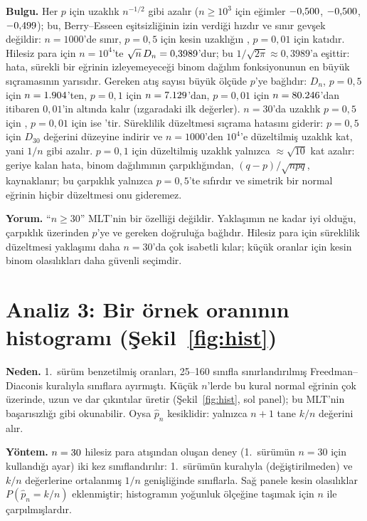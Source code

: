 \documentclass[11pt,a4paper]{article}
\begin{document}
\textbf{Bulgu.} Her $p$ için uzaklık $n^{-1/2}$ gibi azalır ($n \ge 10^3$ için eğimler $-0{,}500$, $-0{,}500$,
$-0{,}499$); bu, Berry--Esseen eşitsizliğinin izin verdiği hızdır ve sınır gevşek değildir: $n = 1000$'de sınır,
$p = 0{,}5$ için kesin uzaklığın \BeOverDHalf{}, $p = 0{,}01$ için \BeOverDHundredth{} katıdır. Hilesiz para için $n = 10^4$'te
$\sqrt n\,D_n = 0{,}3989$'dur; bu $1/\sqrt{2\pi} \approx 0{,}3989$'a eşittir: hata, sürekli bir eğrinin izleyemeyeceği
binom dağılım fonksiyonunun en büyük sıçramasının yarısıdır. Gereken atış sayısı büyük ölçüde $p$'ye bağlıdır: $D_n$,
$p = 0{,}5$ için $n = 1.904$'ten, $p = 0{,}1$ için $n = 7.129$'dan, $p = 0{,}01$ için $n = 80.246$'dan
itibaren $0{,}01$'in altında kalır (ızgaradaki ilk değerler). $n = 30$'da uzaklık $p = 0{,}5$ için \DHalfThirty{}, $p = 0{,}01$
için ise \DHundredthThirty{}'tir. Süreklilik düzeltmesi sıçrama hatasını giderir: $p = 0{,}5$ için $D_{30}$ değerini \DccHalfThirty{}
düzeyine indirir ve $n = 1000$'den $10^4$'e düzeltilmiş uzaklık \DccRatioHalf{} kat, yani $1/n$ gibi azalır. $p = 0{,}1$ için düzeltilmiş
uzaklık yalnızca \DccRatioTenth{} $\approx \sqrt{10}$ kat azalır: geriye kalan hata, binom dağılımının çarpıklığından,
$(q-p)/\sqrt{npq}$, kaynaklanır; bu çarpıklık yalnızca $p = 0{,}5$'te sıfırdır ve simetrik bir normal eğrinin hiçbir düzeltmesi
onu gideremez.

\textbf{Yorum.} ``$n \ge 30$'' MLT'nin bir özelliği değildir. Yaklaşımın ne kadar iyi olduğu, çarpıklık üzerinden $p$'ye ve
gereken doğruluğa bağlıdır. Hilesiz para için süreklilik düzeltmesi yaklaşımı daha $n = 30$'da çok isabetli kılar; küçük
oranlar için kesin binom olasılıkları daha güvenli seçimdir.

\section{Analiz 3: Bir örnek oranının histogramı (Şekil~\ref{fig:hist})}

\textbf{Neden.} 1.\ sürüm benzetilmiş oranları, 25--160 sınıfla sınırlandırılmış Freedman--Diaconis kuralıyla sınıflara ayırmıştı.
Küçük $n$'lerde bu kural normal eğrinin çok üzerinde, uzun ve dar çıkıntılar üretir (Şekil~\ref{fig:hist}, sol panel); bu
MLT'nin başarısızlığı gibi okunabilir. Oysa $\hat p_n$ kesiklidir: yalnızca $n+1$ tane $k/n$ değerini alır.

\textbf{Yöntem.} $n = 30$ hilesiz para atışından oluşan \HistM{} deney (1.\ sürümün $n = 30$ için kullandığı ayar) iki kez sınıflandırılır: 1.\ sürümün kuralıyla
(değiştirilmeden) ve $k/n$ değerlerine ortalanmış $1/n$ genişliğinde sınıflarla. Sağ panele kesin olasılıklar
$P(\hat p_n = k/n)$ eklenmiştir; histogramın yoğunluk ölçeğine taşımak için $n$ ile çarpılmışlardır.
\end{document}

